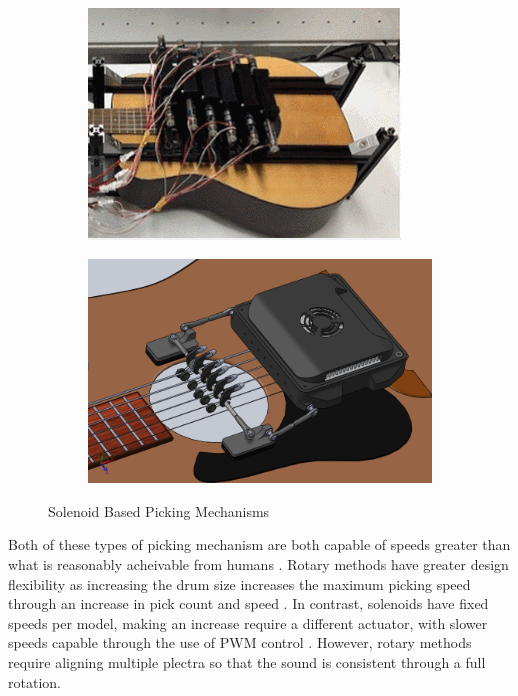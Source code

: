 \documentclass[12pt, a4paper, onecolumn]{IEEEtran}
\begin{document}
\begin{figure}[!h]
\begin{subfigure}{0.3\textwidth}
                \includegraphics[width=\columnwidth]{pwmSolenoid_picking.png}
                \label{fig:pwm_picking}
            \end{subfigure}
            \begin{subfigure}{0.3\textwidth}
                \includegraphics[width=\columnwidth]{pivotSolenoid_picking.png}
                \label{fig:pivot_picking}
            \end{subfigure}
            \caption{Solenoid Based Picking Mechanisms}
            \label{fig:SolenoidPicking}
        \end{figure}

        Both of these types of picking mechanism are both capable of speeds greater than what is reasonably acheivable from humans \cite{pickspeed}. 
        Rotary methods have greater design flexibility as increasing the drum size increases the maximum picking speed through an increase in pick count and speed \cite{VUW_Chordophones,pickspeed}.
        In contrast, solenoids have fixed speeds per model, making an increase require a different actuator, with slower speeds capable through the use of PWM control \cite{PWM_Solenoid}.
        However, rotary methods require aligning multiple plectra so that the sound is consistent through a full rotation.
\end{document}
